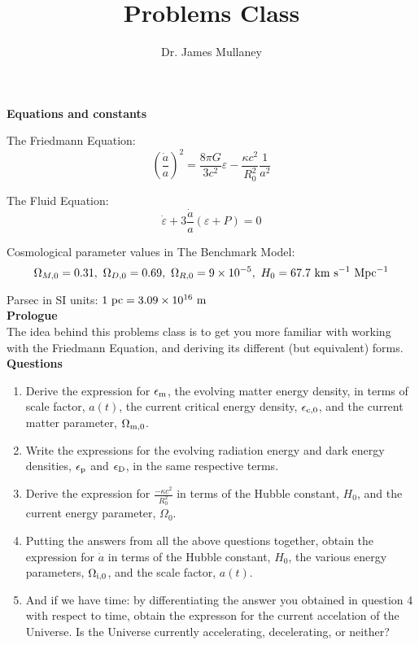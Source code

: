 \documentclass[11pt]{article}
\begin{document}
 
\title{Problems Class }
\author{Dr. James Mullaney}
\maketitle

\noindent
{\bf Equations and constants}

\noindent
The Friedmann Equation:
\begin{equation*}
    \left(\frac{\dot{a}}{a}\right)^2 = \frac{8\pi G}{3c^2}\varepsilon{}-\frac{\kappa c^2}{R_0^2}\frac{1}{a^2}
\end{equation*}

\noindent
The Fluid Equation:
\begin{equation*}
    \dot{\varepsilon{}}+3\frac{\dot{a}}{a}(\varepsilon{}+P) = 0
\end{equation*}

\noindent
Cosmological parameter values in The Benchmark Model:
\begin{equation*}
\Omega_{M,0} = 0.31,~\Omega_{D,0} = 0.69,~\Omega_{R,0} = 9\times10^{-5},~H_0 = 67.7~{\rm km~s^{-1}~Mpc^{-1}}
\end{equation*}

\noindent
Parsec in SI units: ${\rm 1~pc = 3.09\times10^{16}~m}$\\

\noindent
{\bf Prologue}\\
\noindent
The idea behind this problems class is to get you more familiar with working with the Friedmann Equation, and deriving its different (but equivalent) forms.\\

\noindent
{\bf Questions}

\begin{enumerate}
    \item Derive the expression for $\epsilon_{\rm m}$, the evolving matter energy density, in terms of scale factor, $a(t)$, the current critical energy density, $\epsilon_{\rm c,0}$, and the current matter parameter, $\Omega_{\rm m,0}$.
    \item Write the expressions for the evolving radiation energy and dark energy densities, $\epsilon_{\rm p}$ and $\epsilon_{\rm D}$, in the same respective terms.
    \item Derive the expression for $\frac{-\kappa c^2}{R_0^2}$ in terms of the Hubble constant, $H_0$, and the current energy parameter, $\Omega_0$.
    \item Putting the answers from all the above questions together, obtain the expression for $\dot{a}$ in terms of the Hubble constant, $H_0$, the various energy parameters, $\Omega_{\rm i, 0}$, and the scale factor, $a(t)$.
    \item And if we have time: by differentiating the answer you obtained in question 4 with respect to time, obtain the expresson for the current accelation of the Universe. Is the Universe currently accelerating, decelerating, or neither?    
\end{enumerate}
\end{document}
